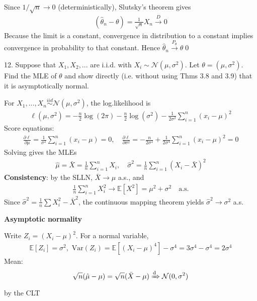 \documentclass[10pt]{article}
\begin{document}
Since $1 / \sqrt{n}\to 0 $ (deterministically), Slutsky's theorem gives 
\begin{gather*}
    (\hat{\theta}_n - \theta) = \frac{1}{\sqrt{n}}X_n\xrightarrow{D} 0
\end{gather*}
Because the limit is a constant, convergence in distribution to a constant implies convergence in probability to that constant. Hence $\hat{\theta}_n\xrightarrow{P_\theta}\theta $\qed

\newpage

12. Suppose that $X_1, X_2, ... $ are i.i.d. with $X_i \sim \mathcal{N}(\mu, \sigma^2)$. Let $\theta = (\mu, \sigma^2)$. Find the MLE of $\theta $ and show directly (i.e. without using Thms 3.8 and 3.9) that it is asymptotically normal.

For $X_1, ..., X_n \overset{iid}{\sim} \mathcal{N}(\mu, \sigma^2)$, the log.likelihood is 
\begin{gather*}
    \ell(\mu, \sigma^2) = -\frac{n}{2}\log (2\pi) - \frac{n}{2}\log(\sigma^2) - \frac{1}{2\sigma^2}\sum_{i = 1}^{n}(x_i - \mu)^2
\end{gather*}
Score equations: 
\begin{gather*}
    \frac{\partial\ell}{\partial\mu} = \frac{1}{\sigma^2}\sum_{i = 1}^{n}(x_i - \mu) = 0,\quad\frac{\partial\ell}{\partial\sigma^2} = -\frac{n}{2\sigma^2} + \frac{1}{2\sigma^4}\sum_{i = 1}^{n}(x_i - \mu)^2 = 0
\end{gather*}
Solving gives the MLEs
\begin{gather*}
    \hat{\mu} = \bar{X} = \frac{1}{n}\sum_{i = 1}^{n}X_i,\quad\hat{\sigma}^2 = \frac{1}{n}\sum_{i = 1}^{n}(X_i - \bar{X})^2
\end{gather*}
\textbf{Consistency}: by the SLLN, $\bar{X}\to\mu $ a.s., and 
\begin{gather*}
    \frac{1}{n}\sum_{i = 1}^{n}X_i^2\to \mathbb{E}[X^2] = \mu^2 + \sigma^2\quad\text{a.s.}
\end{gather*}
Since $\hat{\sigma}^2 = \frac{1}{n}\sum X_i^2 - \bar{X}^2 $, the continuous mapping theorem yields $\hat{\sigma}^2 \to \sigma^2 $ a.s.

\textbf{Asymptotic normality}

Write $Z_i = (X_i - \mu)^2 $. For a normal variable, 
\begin{gather*}
    \mathbb{E}[Z_i] = \sigma^2, \text{ Var}(Z_i) = \mathbb{E}[(X_i - \mu)^4] - \sigma^4 = 3\sigma^4 - \sigma^4 = 2\sigma^4
\end{gather*}
Mean: 
\begin{gather*}
    \sqrt{n}(\hat{\mu} - \mu) = \sqrt{n}(\bar{X} - \mu) \xRightarrow[\text{}]{\text{d}} \mathcal{N}(0, \sigma^2)
\end{gather*}
by the CLT 
\end{document}
